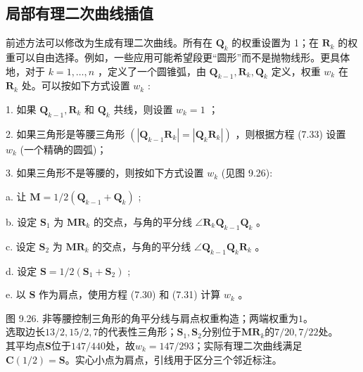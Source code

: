 \documentclass[../main.tex]{subfiles}
\begin{document}
\subsection{局部有理二次曲线插值}

前述方法可以修改为生成有理二次曲线。所有在 \({\mathbf{Q}}_{k}\) 的权重设置为 1；在 \({\mathbf{R}}_{k}\) 的权重可以自由选择。例如，一些应用可能希望段更“圆形”而不是抛物线形。更具体地，对于 \(k = 1,\ldots ,n\) ，定义了一个圆锥弧，由 \({\mathbf{Q}}_{k - 1},{\mathbf{R}}_{k},{\mathbf{Q}}_{k}\) 定义，权重 \({w}_{k}\) 在 \({\mathbf{R}}_{k}\) 处。可以按如下方式设置 \({w}_{k}\) :

1. 如果 \({\mathbf{Q}}_{k - 1},{\mathbf{R}}_{k}\) 和 \({\mathbf{Q}}_{k}\) 共线，则设置 \({w}_{k} = 1\) ；

2. 如果三角形是等腰三角形 \(\left( {\left| {{\mathbf{Q}}_{k - 1}{\mathbf{R}}_{k}}\right|  = \left| {{\mathbf{Q}}_{k}{\mathbf{R}}_{k}}\right| }\right)\) ，则根据方程 (7.33) 设置 \({w}_{k}\) (一个精确的圆弧)；



3. 如果三角形不是等腰的，则按如下方式设置 \({w}_{k}\) (见图 9.26):

a. 让 \(\mathbf{M} = 1/2\left( {{\mathbf{Q}}_{k - 1} + {\mathbf{Q}}_{k}}\right)\) ;

b. 设定 \({\mathbf{S}}_{1}\) 为 \({\mathbf{{MR}}}_{k}\) 的交点，与角的平分线 \(\angle {\mathbf{R}}_{k}{\mathbf{Q}}_{k - 1}{\mathbf{Q}}_{k}\) 。

c. 设定 \({\mathbf{S}}_{2}\) 为 \({\mathbf{{MR}}}_{k}\) 的交点，与角的平分线 \(\angle {\mathbf{Q}}_{k - 1}{\mathbf{Q}}_{k}{\mathbf{R}}_{k}\) 。

d. 设定 \(\mathbf{S} = 1/2\left( {{\mathbf{S}}_{1} + {\mathbf{S}}_{2}}\right)\) ;

e. 以 \(\mathbf{S}\) 作为肩点，使用方程 (7.30) 和 (7.31) 计算 \({w}_{k}\) 。

\begin{center}
\begin{minipage}{27cm}
\vspace*{.6\baselineskip}
\centering
{}
\par\smallskip
图 9.26. 非等腰控制三角形的角平分线与肩点权重构造；两端权重为$1$。\\
选取边长$13/2,15/2,7$的代表性三角形；$\mathbf S_1,\mathbf S_2$分别位于$\mathbf M\mathbf R_k$的$7/20,7/22$处。\\
其平均点$\mathbf S$位于$147/440$处，故$w_k=147/293$；实际有理二次曲线满足$\mathbf C(1/2)=\mathbf S$。实心小点为肩点，引线用于区分三个邻近标注。
\end{minipage}
\end{center}
\end{document}
